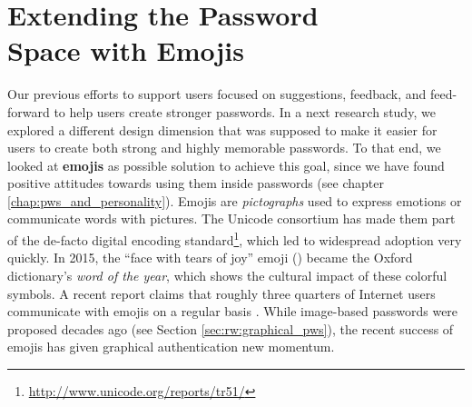 \chapter[Extending the Password Space with Emojis]{Extending the Password \\ Space with Emojis}\label{chap:emojipasswords}

Our previous efforts to support users focused on suggestions, feedback, and feed-forward to help users create stronger passwords. In a next research study, we explored a different design dimension that was supposed to make it easier for users to create both strong and highly memorable passwords. To that end, we looked at \textbf{emojis} as possible solution to achieve this goal, since we have found positive attitudes towards using them inside passwords (see chapter \ref{chap:pws_and_personality}). Emojis are \textit{pictographs} used to express emotions or communicate words with pictures. The Unicode consortium has made them part of the de-facto digital encoding standard\footnote{\label{foot:emoji-standard}\url{http://www.unicode.org/reports/tr51/}}, which led to widespread adoption very quickly. In 2015, the ``face with tears of joy'' emoji () became the Oxford dictionary's \textit{word of the year}, which shows the cultural impact of these colorful symbols. A recent report claims that roughly three quarters of Internet users communicate with emojis on a regular basis \cite{EmogiResearch2016}. While image-based passwords were proposed decades ago (see Section \ref{sec:rw:graphical_pws}), the recent success of emojis has given graphical authentication new momentum. 


